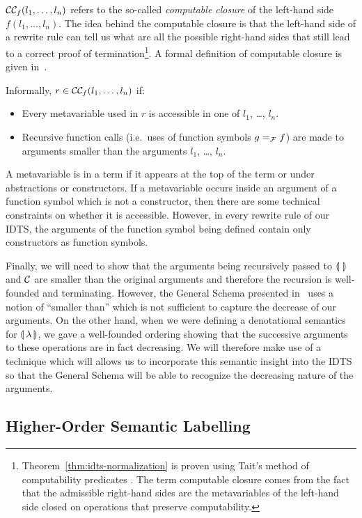 $\mathcal{C}\mathcal{C}_f(l_1, \ldots, l_n)$ refers to the so-called \emph{computable
  closure} of the left-hand side $f(l_1, \ldots, l_n)$. The idea behind the
computable closure is that the left-hand side of a rewrite rule can tell us
what are all the possible right-hand sides that still lead to a correct
proof of termination\footnote{Theorem~\ref{thm:idts-normalization} is
  proven using Tait's method of computability predicates
  \cite{tait1967intensional}. The term computable closure comes from the
  fact that the admissible right-hand sides are the metavariables of the
  left-hand side closed on operations that preserve computability.}. A
formal definition of computable closure is given
in~\cite[p. 8]{blanqui2000termination}.

Informally, $r \in \mathcal{C}\mathcal{C}_f(l_1, \ldots, l_n)$ if:
\begin{itemize}
\item Every metavariable used in $r$ is accessible in one of $l_1$, \ldots,
  $l_n$.
\item Recursive function calls (i.e.\ uses of function symbols $g =_{\mathcal{F}} f$)
  are made to arguments smaller than the arguments $l_1$, \ldots, $l_n$.
\end{itemize}

A metavariable is  in a term if it appears at the top of
the term or under abstractions or constructors. If a metavariable occurs
inside an argument of a function symbol which is not a constructor, then
there are some technical constraints on whether it is accessible. However,
in every rewrite rule of our IDTS, the arguments of the function symbol
being defined contain only constructors as function symbols.

Finally, we will need to show that the arguments being recursively passed
to $\llparenthesis \,  \, \rrparenthesis$ and $\mathcal{C}$ are smaller than the original arguments and
therefore the recursion is well-founded and terminating. However, the
General Schema presented in~\cite{blanqui2000termination} uses a notion of
``smaller than'' which is not sufficient to capture the decrease of our
arguments. On the other hand, when we were defining a denotational
semantics for $\llparenthesis \, \lambda \, \rrparenthesis$, we gave a well-founded ordering showing
that the successive arguments to these operations are in fact
decreasing. We will therefore make use of a technique which will allows us
to incorporate this semantic insight into the IDTS so that the General
Schema will be able to recognize the decreasing nature of the arguments.


\subsection{Higher-Order Semantic Labelling}
\label{ssec:semantic-labelling}

